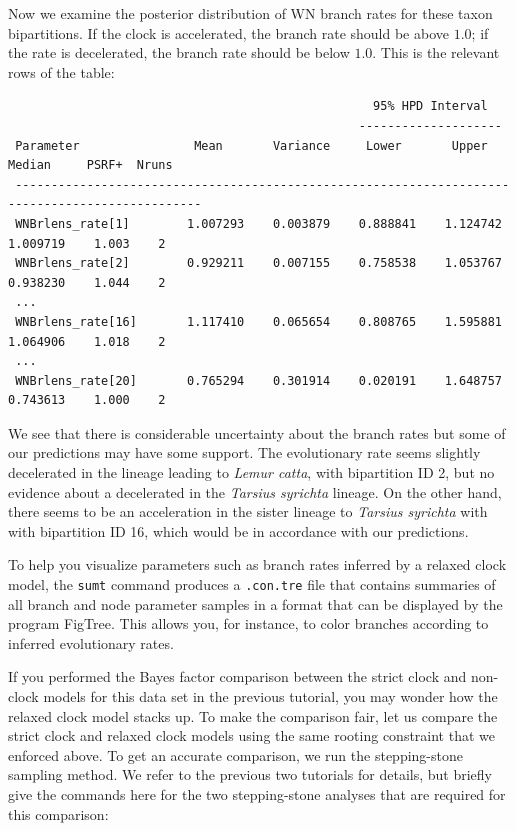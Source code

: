 \documentclass[12pt]{book}
\newcommand{\ttt}[1]{\texttt{#1}}
\begin{document}
Now we examine the posterior distribution of WN branch rates for these taxon bipartitions. If the
clock is accelerated, the branch rate should be above $1.0$; if the rate is decelerated, the branch
rate should be below $1.0$. This is the relevant rows of the table:

\scriptsize
\begin{singlespacing}
\begin{verbatim}
                                                   95% HPD Interval
                                                 --------------------
 Parameter                Mean       Variance     Lower       Upper       Median     PSRF+  Nruns
 ------------------------------------------------------------------------------------------------
 WNBrlens_rate[1]        1.007293    0.003879    0.888841    1.124742    1.009719    1.003    2
 WNBrlens_rate[2]        0.929211    0.007155    0.758538    1.053767    0.938230    1.044    2
 ...
 WNBrlens_rate[16]       1.117410    0.065654    0.808765    1.595881    1.064906    1.018    2
 ...
 WNBrlens_rate[20]       0.765294    0.301914    0.020191    1.648757    0.743613    1.000    2

\end{verbatim}
\end{singlespacing}
\normalsize

We see that there is considerable uncertainty about the branch rates but some of our predictions
may have some support. The evolutionary rate seems slightly decelerated in the lineage leading to
\textit{Lemur catta}, with bipartition ID 2, but no evidence about a decelerated in the
\textit{Tarsius syrichta} lineage. On the other hand, there seems to be an acceleration in the
sister lineage to \textit{Tarsius syrichta} with with bipartition ID 16, which would be in
accordance with our predictions.

To help you visualize parameters such as branch rates inferred by a relaxed clock model, the
\ttt{sumt} command produces a \ttt{.con.tre} file that contains summaries of all branch and node
parameter samples in a format that can be displayed by the program FigTree. This allows you, for
instance, to color branches according to inferred evolutionary rates.

If you performed the Bayes factor comparison between the strict clock and non-clock models for this
data set in the previous tutorial, you may wonder how the relaxed clock model stacks up. To make
the comparison fair, let us compare the strict clock and relaxed clock models using the same
rooting constraint that we enforced above. To get an accurate comparison, we run the stepping-stone
sampling method. We refer to the previous two tutorials for details, but briefly give the commands
here for the two stepping-stone analyses that are required for this comparison:
\end{document}
